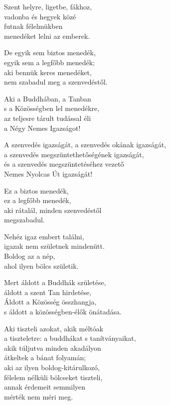 \begin{dhpverse}

 Szent helyre, ligetbe, fákhoz,\\
vadonba és hegyek közé\\
futnak félelmükben\\
menedéket lelni az emberek.

 De egyik sem biztos menedék,\\
egyik sem a legfőbb menedék;\\
aki bennük keres menedéket,\\
nem szabadul meg a szenvedéstől.

 Aki a Buddhában, a Tanban\\
s a Közösségben lel menedékre,\\
az teljesre tárult tudással éli\\
a Négy Nemes Igazságot!

 A szenvedés igazságát, a szenvedés okának igazságát,\\
a szenvedés megszüntethetőségének igazságát,\\
és a szenvedés megszüntetéséhez vezető\\
Nemes Nyolcas Út igazságát!

 Ez a biztos menedék,\\
ez a legfőbb menedék,\\
aki rátalál, minden szenvedéstől\\
megszabadul.

 Nehéz igaz embert találni,\\
igazak nem születnek mindenütt.\\
Boldog az a nép,\\
ahol ilyen bölcs születik.

\end{dhpverse}
\newpage
\begin{dhpverse}

 Mert áldott a Buddhák születése,\\
áldott a szent Tan hirdetése,\\
Áldott a Közösség összhangja,\\
s áldott a közösségben-élők önátadása.

 Aki tiszteli azokat, akik méltóak\\
a tiszteletre: a buddhákat s tanítványaikat,\\
akik túljutva minden akadályon\\
átkeltek a bánat folyamán;\\
aki az ilyen boldog-kitárulkozó,\\
félelem nélküli bölcseket tiszteli,\\
annak érdemeit semmilyen\\
mérték nem méri meg.

\end{dhpverse}
